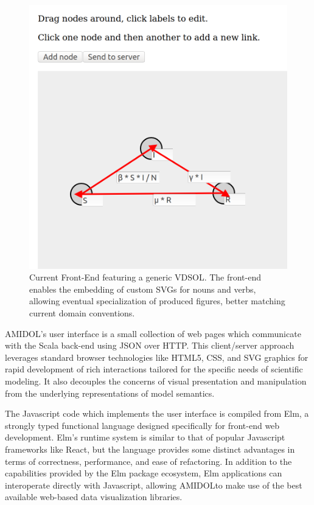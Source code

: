 \documentclass[11pt]{article}
\newcommand{\amidol}{\textsc{AMIDOL}}
\begin{document}
\begin{figure}
\includegraphics[width=\textwidth]{figs/Editor2.png}
\caption{Current Front-End featuring a generic VDSOL.  The front-end enables the embedding of custom SVGs for nouns and verbs, allowing eventual specialization of produced figures, better matching current domain conventions.}
\label{Fig:Editor}
\end{figure}

\amidol{}'s user interface is a small collection of web pages which communicate with the Scala back-end using JSON over HTTP.  This client/server approach leverages standard browser technologies like HTML5, CSS, and SVG graphics for rapid development of rich interactions tailored for the specific needs of scientific modeling. It also decouples the concerns of visual presentation and manipulation from the underlying representations of model semantics.

The Javascript code which implements the user interface is compiled from Elm, a strongly typed functional language designed specifically for front-end web development. Elm's runtime system is similar to that of popular Javascript frameworks like React, but the language provides some distinct advantages in terms of correctness, performance, and ease of refactoring. In addition to the capabilities provided by the Elm package ecosystem, Elm applications can interoperate directly with Javascript, allowing \amidol to make use of the best available web-based data visualization libraries.
\end{document}
